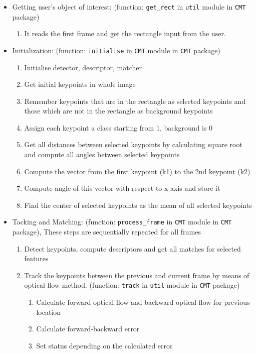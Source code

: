 \documentclass[[12pt,DIV14,BCOR12mm,a4paper,footexclude,headinclude,halfparskip-,twoside,openright,cleardoubleempty,idxtotoc,bibtotoc]{article}
\begin{document}
\begin{itemize}


  \item Getting user's object of interest: (function:  \texttt{get\_rect} in \texttt{util} module in \texttt{CMT} package)
  \begin{enumerate}
    \item It reads the first frame and get the rectangle input from the user.
  \end{enumerate}

\item Initialization:  (function: \texttt{initialise} in \texttt{CMT} module in \texttt{CMT} package)
  \begin{enumerate}
    	\item Initialise detector, descriptor, matcher
  	  \item Get initial keypoints in whole image
	\item Remember keypoints that are in the rectangle as selected keypoints and those which are not in the rectangle as background keypoints
	\item Assign each keypoint a class starting from 1, background is 0
	\item Get all distances between selected keypoints by calculating square root and compute all angles between selected keypoints
	\item Compute the vector from the first keypoint (k1) to the 2nd keypoint (k2)
	\item Compute angle of this vector with respect to x axis and store it
	\item Find the center of selected keypoints as the mean of all selected keypoints
  \end{enumerate}


  \item Tacking and Matching: (function: \texttt{process\_frame} in \texttt{CMT} module in \texttt{CMT} package), These steps are sequentially repeated for all frames
  \begin{enumerate}
    	\item Detect keypoints, compute descriptors and get all matches for selected features
	\item Track the keypoints between the previous and current frame by means of optical flow method. (function: \texttt{track} in \texttt{util} module in \texttt{CMT} package)

\begin{enumerate}
    	\item Calculate forward optical flow and backward optical flow for previous location
   	 \item Calculate forward-backward error
	\item Set status depending on the calculated error
  \end{enumerate}


\end{enumerate}
\end{itemize}
\end{document}
